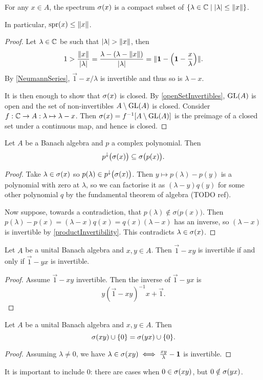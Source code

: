 \begin{proposition} \label{spectrumCompact}
For any $x\in A$, the spectrum $\sigma(x)$ is a compact subset of $\setbuilder{\lambda\in\C}{|\lambda|\leq \norm{x}}$.

In particular, $\operatorname{spr}(x) \leq \lVert x\rVert$.
\end{proposition}
\begin{proof}
Let $\lambda\in \mathbb{C}$ be such that $|\lambda|>\norm{x}$, then
\[ 1 > \frac{\lVert x\rVert}{|\lambda|} = \frac{\lambda - (\lambda - \lVert x\rVert)}{|\lambda|} = \lVert\boldsymbol{\mathrm{1}} - \left(\boldsymbol{\mathrm{1}} - \frac{x}{\lambda}\right)\rVert. \]
By \ref{NeumannSeries}, $\vec{1} - x/\lambda$ is invertible and thus so is $\lambda-x$.

It is then enough to show that $\sigma(x)$ is closed. By \ref{openSetInvertibles}, $\operatorname{GL}(A)$ is open and the set of non-invertibles $A\setminus \operatorname{GL}(A)$ is closed. Consider $f: \mathbb{C} \to A: \lambda \mapsto \lambda - x$. Then $\sigma(x) = f^{-1}[A\setminus \operatorname{GL}(A)]$ is the preimage of a closed set under a continuous map, and hence is closed.
\end{proof}

\begin{lemma} \label{polynomialSpectralMapping}
Let $A$ be a Banach algebra and $p$ a complex polynomial. Then
\[ p^{\downarrow}\big(\sigma(x)\big) \subseteq \sigma\big(p(x)\big). \]
\end{lemma}
\begin{proof}
Take $\lambda\in\sigma(x)$ so $p(\lambda)\in p^{\downarrow}\big(\sigma(x)\big)$. Then $y\mapsto p(\lambda)-p(y)$ is a polynomial with zero at $\lambda$, so we can factorise it as $(\lambda - y)q(y)$ for some other polynomial $q$ by the fundamental theorem of algebra (TODO ref).

Now suppose, towards a contradiction, that $p(\lambda)\notin \sigma\big(p(x)\big)$. Then $p(\lambda) - p(x) = (\lambda - x)q(x) = q(x)(\lambda - x)$ has an inverse, so $(\lambda - x)$ is invertible by \ref{productInvertibility}. This contradicts $\lambda\in\sigma(x)$.
\end{proof}

\begin{proposition}
Let $A$ be a unital Banach algebra and $x,y\in A$. Then $\vec{1} - xy$ is invertible \textup{if and only if} $\vec{1} - yx$ is invertible.
\end{proposition}
\begin{proof}
Assume $\vec{1} - xy$ invertible. Then the inverse of $\vec{1} - yx$ is
\[ y(\vec{1} - xy)^{-1}x + \vec{1}. \]
\end{proof}
\begin{corollary}
Let $A$ be a unital Banach algebra and $x,y\in A$. Then
\[ \sigma(xy)\cup\{0\} = \sigma(yx)\cup\{0\}. \]
\end{corollary}
\begin{proof}
Assuming $\lambda \neq 0$, we have $\lambda\in\sigma(xy) \iff \frac{xy}{\lambda} - \boldsymbol{\mathrm{1}}$ is invertible.
\end{proof}
It is important to include $0$: there are cases when $0\in \sigma(xy)$, but $0\notin \sigma(yx)$.

